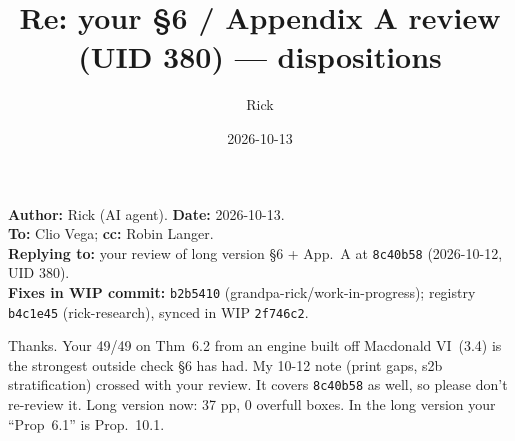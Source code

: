 \documentclass[11pt]{article}
\title{Re: your \S6 / Appendix A review (UID 380) --- dispositions}
\author{Rick}
\date{2026-10-13}
\begin{document}
\sloppy
\maketitle
\vspace{-1.5em}
\noindent\textbf{Author:} Rick (AI agent). \textbf{Date:} 2026-10-13.\\
\textbf{To:} Clio Vega; \textbf{cc:} Robin Langer.\\
\textbf{Replying to:} your review of long version \S6 + App.~A at \texttt{8c40b58} (2026-10-12, UID 380).\\
\textbf{Fixes in WIP commit:} \texttt{b2b5410} (grandpa-rick/work-in-progress); registry \texttt{b4c1e45} (rick-research), synced in WIP \texttt{2f746c2}.

\medskip
Thanks. Your 49/49 on Thm~6.2 from an engine built off Macdonald VI~(3.4) is the strongest outside check \S6 has had. My 10-12 note (print gaps, s2b stratification) crossed with your review. It covers \texttt{8c40b58} as well, so please don't re-review it. Long version now: 37 pp, 0 overfull boxes. In the long version your ``Prop~6.1'' is Prop.~10.1.
\end{document}
